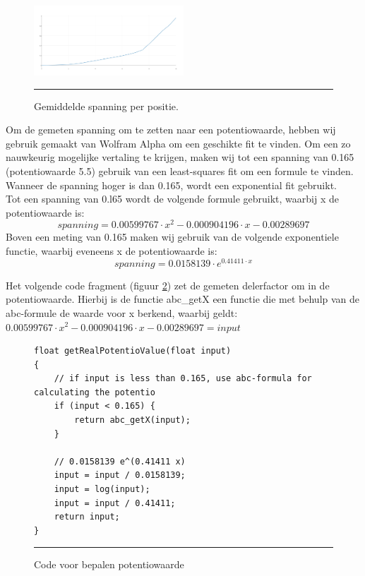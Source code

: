 \documentclass[a4paper,12pt]{article}
\begin{document}
\vspace{1em}
\begin{figure}[!htbp]
\centering
\includegraphics[width=0.5\textwidth, scale=0.5]{plot.png}
\vspace{1ex}
\hrule
\caption{Gemiddelde spanning per positie.}
\label{fig:measurings}
\end{figure}

Om de gemeten spanning om te zetten naar een potentiowaarde, hebben wij gebruik gemaakt van Wolfram Alpha om een geschikte fit te vinden. Om een zo nauwkeurig mogelijke vertaling te krijgen, maken wij tot een spanning van 0.165 (potentiowaarde 5.5) gebruik van een least-squares fit om een formule te vinden. Wanneer de spanning hoger is dan 0.165, wordt een exponential fit gebruikt.\\
Tot een spanning van 0.l65 wordt de volgende formule gebruikt, waarbij x de potentiowaarde is:
\begin{equation}
    spanning = 0.00599767 \cdot x^2 - 0.000904196 \cdot x - 0.00289697
\end{equation}
Boven een meting van 0.165 maken wij gebruik van de volgende exponentiele functie, waarbij eveneens x de potentiowaarde is:
\begin{equation}
    spanning = 0.0158139 \cdot e^{0.41411 \cdot x}
\end{equation}

Het volgende code fragment (figuur \ref{code:determinePotentio}) zet de gemeten delerfactor om in de potentiowaarde. Hierbij is de functie abc\_getX een functie die met behulp van de abc-formule de waarde voor x berkend, waarbij geldt:\\
$0.00599767 \cdot x^2 - 0.000904196 \cdot x - 0.00289697 = input$

\begin{figure}
\begin{lstlisting}
float getRealPotentioValue(float input)
{
    // if input is less than 0.165, use abc-formula for calculating the potentio
    if (input < 0.165) {
        return abc_getX(input);
    }
    
    // 0.0158139 e^(0.41411 x)
    input = input / 0.0158139;
    input = log(input);
    input = input / 0.41411;
    return input;
}
\end{lstlisting}
\vspace{1ex}
\hrule
\caption{Code voor bepalen potentiowaarde}
\label{code:determinePotentio}
\end{figure}
\end{document}
